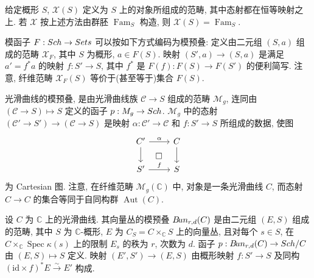 给定概形 $S$,  $\mathcal X(S)$ 定义为 $S$ 上的对象所组成的范畴, 其中态射都在恒等映射之上. 若 $\mathcal X$ 按上述方法由群胚 $\operatorname{Fam}_S$ 构造, 则 $\mathcal X(S)=\operatorname{Fam}_S$.
\begin{example}[将集合值函子视为预叠]\label{src:1.6.1}
模函子 $F:Sch\to Sets$ 可以按如下方式编码为模预叠: 定义由二元组 $(S,a)$ 组成的范畴 $\mathcal X_F$, 其中 $S$ 为概形, $a\in F(S)$. 映射 $(S',a)\to(S,a)$ 是满足 $a'=f^*a$ 的映射 $f:S'\to S$, 其中 $f^*$ 是 $F(f):F(S)\to F(S')$ 的便利简写. 注意, 纤维范畴 $\mathcal X_F(S)$ 等价于(甚至等于)集合 $F(S)$.
\end{example}
\begin{example}[光滑曲线的模预叠]\label{src:1.6.2}
光滑曲线的模预叠, 是由光滑曲线族 $\mathcal C\to S$ 组成的范畴 $\mathcal M_g$, 连同由 $(\mathcal C\to S)\mapsto S$ 定义的函子 $p:M_g\to Sch$. $\mathcal M_g$ 中的态射 $(\mathcal C'\to S')\to(\mathcal C\to S)$ 是映射 $\alpha:\mathcal C'\to\mathcal C$ 和 $f:S'\to S$ 所组成的数据, 使图
\[
\begin{tikzcd}
\mathcal C'\arrow[r,"\alpha"]\arrow[d]\arrow[dr,phantom,"\square"] & \mathcal C\arrow[d]\\
S'\arrow[r,"f"] & S
\end{tikzcd}
\]
为 Cartesian 图. 注意, 在纤维范畴 $\mathcal M_g(\mathbb C)$ 中, 对象是一条光滑曲线 $C$, 而态射 $C\to C$ 的集合等同于自同构群 $\operatorname{Aut}(C)$.
\end{example}
\begin{example}[向量丛的模预叠]\label{src:1.6.3}
设 $C$ 为 $\mathbb C$ 上的光滑曲线. 其向量丛的模预叠 $B\!un_{r,d}(C)$ 是由二元组 $(E,S)$ 组成的范畴, 其中 $S$ 为 $\mathbb C$-概形, $E$ 为 $C_S=C\times_{\mathbb C}S$ 上的向量丛, 且对每个 $s\in S$, 在 $C\times_{\mathbb C}\operatorname{Spec}\kappa(s)$ 上的限制 $E_s$ 的秩为 $r$, 次数为 $d$. 函子 $p:B\!un_{r,d}(C)\to Sch/C$ 由 $(E,S)\mapsto S$ 定义. 映射 $(E',S')\to(E,S)$ 由概形映射 $f:S'\to S$ 及同构 $(\mathrm{id}\times f)^*E\xrightarrow{\sim}E'$ 构成.
\end{example}

